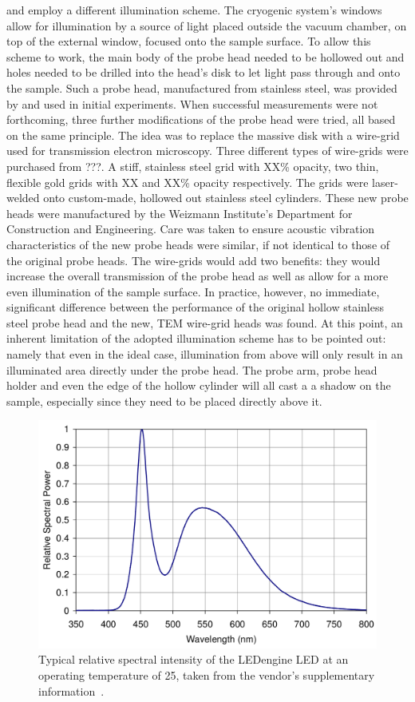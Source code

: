 and employ a different illumination scheme. The cryogenic system's windows allow for illumination by a source of light placed outside the vacuum chamber, on top of the external window, focused onto the sample surface. To allow this scheme to work, the main body of the probe head needed to be hollowed out and holes needed to be drilled into the head's disk to let light pass through and onto the sample. Such a probe head, manufactured from stainless steel, was provided by \McA{} and used in initial experiments. When successful measurements were not forthcoming, three further modifications of the probe head were tried, all based on the same principle. The idea was to replace the massive disk with a wire-grid used for transmission electron microscopy. Three different types of wire-grids were purchased from ???. A stiff, stainless steel grid with XX\% opacity, two thin, flexible gold grids with XX and XX\% opacity respectively. The grids were laser-welded onto custom-made, hollowed out stainless steel cylinders. These new probe heads were manufactured by the Weizmann Institute's Department for Construction and Engineering. Care was taken to ensure acoustic vibration characteristics of the new probe heads were similar, if not identical to those of the original \McA{} probe heads. The wire-grids would add two benefits: they would increase the overall transmission of the probe head as well as allow for a more even illumination of the sample surface. In practice, however, no immediate, significant difference between the performance of the original hollow stainless steel probe head and the new, TEM wire-grid heads was found. At this point, an inherent limitation of the adopted illumination scheme has to be pointed out: namely that even in the ideal case, illumination from above will only result in an illuminated area directly under the probe head. The probe arm, probe head holder and even the edge of the hollow cylinder will all cast a a shadow on the sample, especially since they need to be placed directly above it.\\
\begin{figure}
\centering
	\includegraphics[width=0.8\linewidth]{./figs/ledspec}
	\caption{Typical relative spectral intensity of the LEDengine LED at an operating temperature of 25\degcent{}, taken from the vendor's supplementary information~\cite[p. 10]{ledengin}.}
	\label{fig:ledspec}
\end{figure}
